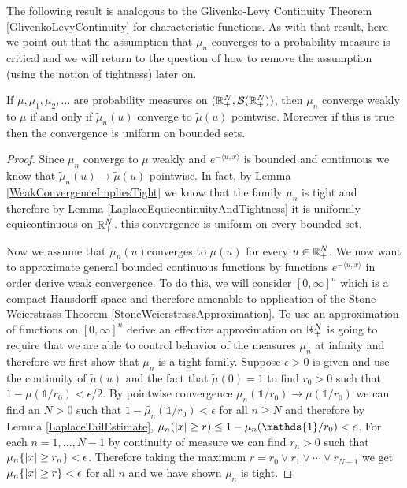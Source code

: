 The following result is analogous to the Glivenko-Levy Continuity
Theorem \ref{GlivenkoLevyContinuity} for characteristic functions.  As
with that result, here we point out that the assumption that $\mu_n$
converges to a probability measure is critical and we will return to the
question of how to remove the assumption (using the notion of tightness) later on.
\begin{thm}\label{GlivenkoLevyContinuityLaplace}If $\mu, \mu_1, \mu_2, \dots$
  are probability measures on $(\mathbb{R}^N_+, \mathcal{B}(\mathbb{R}^N_+))$,
  then $\mu_n$ converge weakly to $\mu$ if and only if $\tilde{\mu}_n(u)$
  converge to $\tilde{\mu}(u)$ pointwise.  Moreover if this is true
  then the convergence is uniform on bounded sets.
\end{thm}
\begin{proof}
Since $\mu_n$ converge to $\mu$ weakly and $e^{-\langle u,x \rangle}$
is bounded and continuous we know that $\tilde{\mu}_n(u) \to
\tilde{\mu}(u)$ pointwise.  In fact, by Lemma
\ref{WeakConvergenceImpliesTight} we know that the family $\mu_n$
is tight and therefore by Lemma
\ref{LaplaceEquicontinuityAndTightness} it is uniformly equicontinuous
on $\mathbb{R}^N_+$.  this convergence is uniform on
every bounded set.

Now we assume that $\tilde{\mu}_n(u)$converges to $\tilde{\mu}(u)$ for
every $u \in \mathbb{R}^N_+$.  We now want to approximate general bounded
continuous functions by functions $e^{-\langle u,x \rangle}$ in order
derive weak convergence.  To do this, we will consider $[0,\infty]^n$
which is a compact Hausdorff space and therefore amenable to
application of the Stone Weierstrass Theorem
\ref{StoneWeierstrassApproximation}.  To use an approximation of
functions on $[0,\infty]^n$ derive an effective approximation on
$\mathbb{R}^N_+$ is going to require that we are able to control behavior
of the measures $\mu_n$ at infinity and therefore we first show that
$\mu_n$ is a tight family.  Suppose $\epsilon > 0$ is given and use
the continuity of $\tilde{\mu}(u)$ and the fact that
$\tilde{\mu}(0)=1$ to find $r_0 > 0$ such that $1 - \mu(\mathds{1}/r_0) <
\epsilon/2$.  By pointwise convergence $\mu_n(\mathds{1}/r_0) \to \mu(\mathds{1}/r_0)$ we
can find an $N > 0$ such that $1 - \tilde{\mu_n}(\mathds{1}/r_0) < \epsilon$ for all $n
\geq N$ and therefore by Lemma \ref{LaplaceTailEstimate}, $\mu_n(\abs{x} \geq r)  \leq 1 - \mu_n(\mathds{1}/r_0) <
\epsilon$.  For each $n = 1, \dotsc, N-1$ by continuity of measure  we
can find $r_n > 0$ such that $\mu_n\lbrace \left \vert x \right \vert \geq r_n \rbrace <
\epsilon$.  Therefore taking the maximum $r = r_0 \vee r_1 \vee \dotsb \vee
r_{N-1}$ we get $\mu_n\lbrace \left \vert x \right \vert \geq r \rbrace <
\epsilon$ for all $n$ and we have shown $\mu_n$ is tight.


\end{proof}
